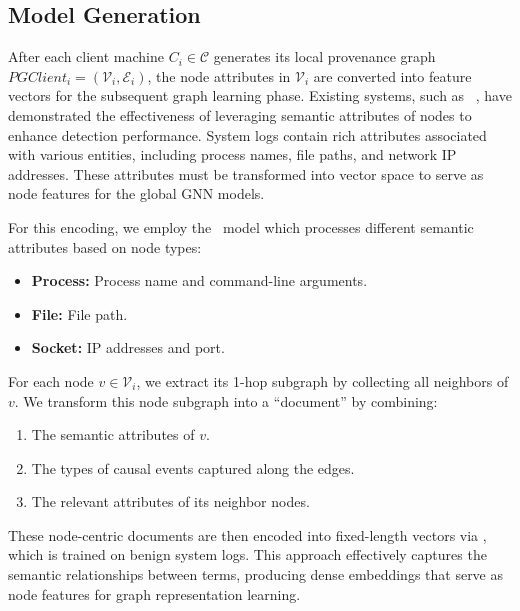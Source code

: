 \subsection{\wordvec Model Generation}
\label{sub:word2vec:model}

After each client machine \(C_i\in \mathcal{C}\) generates its local provenance graph \(PGClient_{i} = (\mathcal{V}_i, \mathcal{E}_i)\), the node attributes in \(\mathcal{V}_i\) are converted into feature vectors for the subsequent graph learning phase. Existing systems, such as \flash~\cite{flash2024}, have demonstrated the effectiveness of leveraging semantic attributes of nodes to enhance detection performance. System logs contain rich attributes associated with various entities, including process names, file paths, and network IP addresses. These attributes must be transformed into vector space to serve as node features for the global GNN models.

For this encoding, we employ the \wordvec~model which processes different semantic attributes based on node types:
\begin{itemize}[itemsep=0.1em, parsep=0em, topsep=0em, leftmargin=*]
    \item \textbf{Process:} Process name and command-line arguments.
    \item \textbf{File:} File path.
    \item \textbf{Socket:} IP addresses and port.
\end{itemize}


  

For each node \(v \in \mathcal{V}_i\), we extract its 1-hop subgraph by collecting all neighbors of \(v\). We transform this node subgraph into a ``document'' by combining:
\begin{enumerate}[itemsep=0.1em, parsep=0em, topsep=0em, leftmargin=*]
    \item The semantic attributes of \(v\).
    \item The types of causal events captured along the edges.
    \item The relevant attributes of its neighbor nodes.
\end{enumerate}

These node-centric documents are then encoded into fixed-length vectors via \wordvec, which is trained on benign system logs. This approach effectively captures the semantic relationships between terms, producing dense embeddings that serve as node features for graph representation learning.

